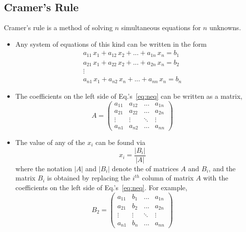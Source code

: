 \documentclass[12pt]{article}
\begin{document}
\begin{latexonly}
\subsection*{Cramer's Rule}
\end{latexonly}

Cramer's rule is a method of solving $n$ simultaneous equations
for $n$ unknowns. 

\begin{itemize}
\item Any system of equations of this kind can be written
in the form 
\begin{equation}
\begin{array}{c}
a_{11} \, x_1 + a_{12} \, x_2 + ... + a_{1n} \, x_n = b_{1} \\
a_{21} \, x_1 + a_{22} \, x_2 + ... + a_{2n} \, x_n = b_{2} \\
\vdots \\
a_{n1} \, x_1 + a_{n2} \, x_n + ... + a_{nn} \, x_n = b_{n} 
\end{array}
\label{eq:neq}
\end{equation}

\item The coefficients on the left side of Eq.'s~\ref{eq:neq} can be
  written as a matrix, 
\begin{equation}
A = 
\left(
\begin{array}{cccc}
a_{11}  & a_{12} & ...    & a_{1n} \\
a_{21}  & a_{22} & ...    & a_{2n} \\
\vdots  &\vdots  & \ddots & \vdots \\
a_{n1}  & a_{n2} & ...    & a_{nn}
\end{array}
\right)
\end{equation}

\item The value of any of the $x_i$ can be found via
\begin{equation}
x_i = \frac{|B_i|}{|A|}
\label{eq:sols}
\end{equation}
where the notation $|A|$ and $|B_i|$ denote the 
of matrices $A$ and $B_i$, and the matrix $B_i$ is obtained by
replacing the $i^{th}$ column of matrix $A$ with the coefficients on
the left side of Eq.'s~\ref{eq:neq}. For example,
\begin{equation}
B_2 = 
\left(
\begin{array}{cccc}
a_{11} & b_1    & ...    & a_{1n} \\
a_{21} & b_2    & ...    & a_{2n} \\
\vdots & \vdots & \ddots & \vdots \\
a_{n1} & b_n    & ...    & a_{nn}
\end{array}
\right)
\end{equation}

\end{itemize}
\end{document}

